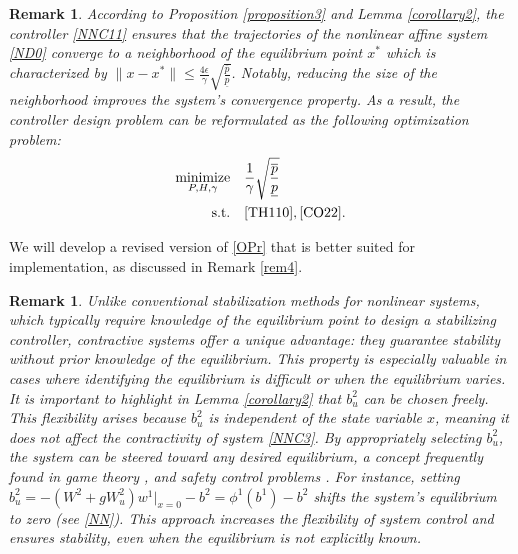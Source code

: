 \documentclass[journal,twoside,web]{ieeecolor}
\newtheorem{remark}	      [theorem]{Remark}
\begin{document}
\begin{remark}\label{rem3}
According to Proposition \ref{proposition3} and Lemma \ref{corollary2}, the controller \eqref{NNC11} ensures that the trajectories of the nonlinear affine system \eqref{ND0} converge to a neighborhood of the equilibrium point $x^*$ which is characterized by $\|x-x^*\|\leq \frac{4\epsilon}{\gamma}\sqrt{\frac{\overline{p}}{\underline{p}}}$. Notably, reducing the size of the neighborhood improves the system's convergence property. As a result, the controller design problem can be reformulated as the following optimization problem:
\begin{align}
\underset{P,H,\gamma}{\text{minimize}}  \quad & \frac{1}{\gamma}\sqrt{\frac{\overline{p}}{\underline{p}}}\nonumber\\
\text{s.t.} \quad & \eqref{TH110}, \eqref{CO22}.\label{OPr}
\end{align}
\end{remark}
We will develop a revised version of \eqref{OPr} that is better suited for implementation, as discussed in Remark \ref{rem4}.
\begin{remark}\label{REM4}
Unlike conventional stabilization methods for nonlinear systems, which typically require knowledge of the equilibrium point to design a stabilizing controller, contractive systems offer a unique advantage: they guarantee stability without prior knowledge of the equilibrium. This property is especially valuable in cases where identifying the equilibrium is difficult or when the equilibrium varies. It is important to highlight in Lemma \ref{corollary2} that $b_u^{2}$ can be chosen freely. This flexibility arises because $b_u^{2}$ is independent of the state variable $x$, meaning it does not affect the contractivity of system \eqref{NNC3}. By appropriately selecting $b_u^{2}$, the system can be steered toward any desired equilibrium, a concept frequently found in game theory \cite{alpcan2009control}, and safety control problems \cite{reis2020control}. For instance, setting $b_u^{2} = -(W^2 + gW_u^{2})w^1|_{x=0} - b^2=\phi^1(b^1)-b^2$ shifts the system's equilibrium to zero (see \eqref{NN}). This approach increases the flexibility of system control and ensures stability, even when the equilibrium is not explicitly known.
\end{remark}
\end{document}
